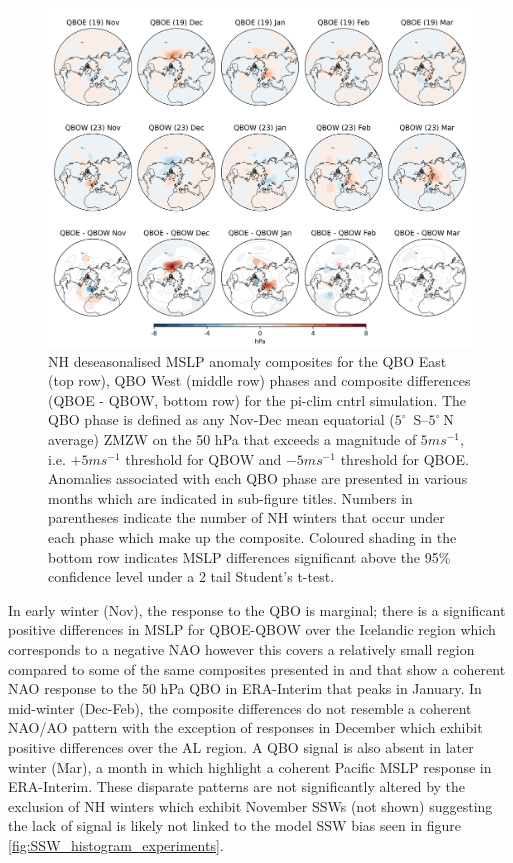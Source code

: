 \begin{figure}[h!]
\begin{center}
\noindent\includegraphics[width =0.8\linewidth]{Figures/Figures-deepQBO/LAGGED_SLP_composites_individual_months_QBO_phases_U_piclim_50hPa_5thresh.png}
\caption[MSLP composites under QBO phases in the pi-clim cntrl simulation]{NH deseasonalised MSLP anomaly composites for the QBO East (top row), QBO West (middle row) phases and composite differences (QBOE - QBOW, bottom row) for the pi-clim cntrl simulation. The QBO phase is defined as any Nov-Dec mean equatorial ($5^{\circ}$\ S--$5^{\circ}\ $N average) ZMZW on the 50 hPa that exceeds a magnitude of $5 ms^{-1}$, i.e. $+5 ms^{-1}$ threshold for QBOW and $-5 ms^{-1}$ threshold for QBOE. Anomalies associated with each QBO phase are presented in various months which are indicated in sub-figure titles. Numbers in parentheses indicate the number of NH winters that occur under each phase which make up the composite. Coloured shading in the bottom row indicates MSLP differences significant above the 95\% confidence level under a 2 tail Student’s t-test.}
\label{fig:SLP_piclim}
\end{center}
\end{figure}

In early winter (Nov), the response to the QBO is marginal; there is a significant positive differences in MSLP for QBOE-QBOW over the Icelandic region which corresponds to a negative NAO however this covers a relatively small region compared to some of the same composites presented in \cite{andrewsObserved2019d} and \cite{graySurface2018b} that show a coherent NAO response to the 50 hPa QBO in ERA-Interim that peaks in January. In mid-winter (Dec-Feb), the composite differences do not resemble a coherent NAO/AO pattern with the exception of responses in December which exhibit positive differences over the AL region. A QBO signal is also absent in later winter (Mar), a month in which \cite{graySurface2018b} highlight a coherent Pacific MSLP response in ERA-Interim. These disparate patterns are not significantly altered by the exclusion of NH winters which exhibit November SSWs (not shown) suggesting the lack of signal is likely not linked to the model SSW bias seen in figure \ref{fig:SSW_histogram_experiments}. 

